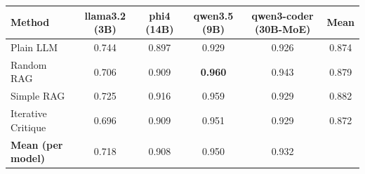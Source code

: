 \begin{tabular}{@{}lccccc@{}}
\toprule
Method & llama3.2 (3B) & phi4 (14B) & qwen3.5 (9B) & qwen3-coder (30B-MoE) & Mean \\
\midrule
Plain LLM & 0.744 & 0.897 & 0.929 & 0.926 & 0.874 \\
Random RAG & 0.706 & 0.909 & \textbf{0.960} & 0.943 & 0.879 \\
Simple RAG & 0.725 & 0.916 & 0.959 & 0.929 & 0.882 \\
Iterative Critique & 0.696 & 0.909 & 0.951 & 0.929 & 0.872 \\
\midrule
\textbf{Mean (per model)} & 0.718 & 0.908 & 0.950 & 0.932 & \\
\bottomrule
\end{tabular}
